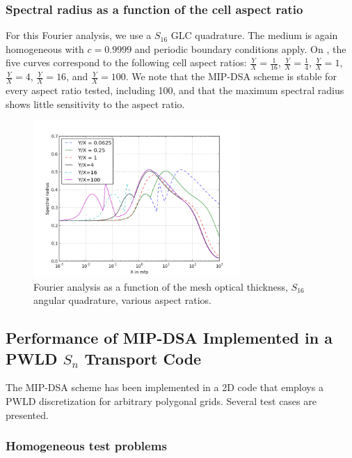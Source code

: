 \subsubsection{Spectral radius as a function of the cell aspect ratio}
For this Fourier analysis, we use a $S_{16}$ GLC quadrature. The medium is
again homogeneous with $c=0.9999$ and periodic boundary conditions apply. 
On , the five curves correspond to the following cell aspect 
ratios: $\frac{Y}{X}=\frac{1}{16}$, $\frac{Y}{X}=\frac{1}{4}$,
$\frac{Y}{X}=1$, $\frac{Y}{X}=4$, $\frac{Y}{X}=16$, and $\frac{Y}{X}=100$.
We note that the MIP-DSA scheme is stable for every aspect ratio tested, including 100, 
and that the maximum spectral radius shows little sensitivity to the aspect ratio.
\begin{figure}[!htbp]
  \centering
  \includegraphics[width=0.7\textwidth]{aspect_ratio_9999_2}
  \caption{Fourier analysis as a function of the mesh optical thickness,
  $S_{16}$ angular quadrature, various aspect ratios.}
  \label{fig_fa_ar}
\end{figure}

\subsection{Performance of MIP-DSA Implemented in a PWLD $S_n$ Transport Code}
The MIP-DSA scheme has been implemented in a 2D \sn code that employs a PWLD discretization
for arbitrary polygonal grids. Several test cases are presented.

\subsubsection{Homogeneous test problems}  \label{sec_homog}

